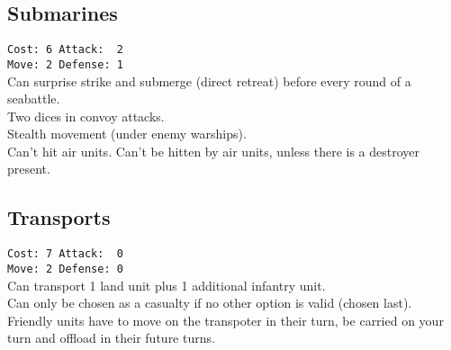 \documentclass[10pt,twoside]{article}
\begin{document}
\begin{multicols*}{3}
\subsection*{Submarines}
\texttt{Cost: 6 \quad\quad\quad Attack: ~2 \\ Move: 2 \quad\quad\quad Defense: 1 \\ }
Can surprise strike and submerge (direct retreat) before every round of a seabattle.\\
Two dices in convoy attacks.\\
Stealth movement (under enemy warships).\\
Can't hit air units. Can't be hitten by air units, unless there is a destroyer present.

\subsection*{Transports}
\texttt{Cost: 7 \quad\quad\quad Attack: ~0 \\ Move: 2 \quad\quad\quad Defense: 0 \\ }
Can transport 1 land unit plus 1 additional infantry unit.\\
Can only be chosen as a casualty if no other option is valid (\glqq chosen last\grqq).\\
Friendly units have to move on the transpoter in their turn, be carried on your turn and offload in their future turns.


\end{multicols*}
\end{document}
